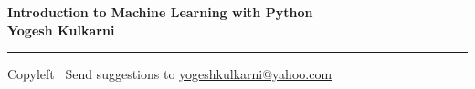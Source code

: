 
\graphicspath{{images/}}

\footnotesize


\begin{center}
\Large{\textbf{Introduction to Machine Learning with Python\\ Yogesh Kulkarni}}  
\end{center}

\begin{multicols}{2}

\end{multicols}

\rule{\linewidth}{0.25pt}
\scriptsize
Copyleft \textcopyleft\  Send suggestions to 
\href{http://www.yogeshkulkarni.com}{yogeshkulkarni@yahoo.com}


